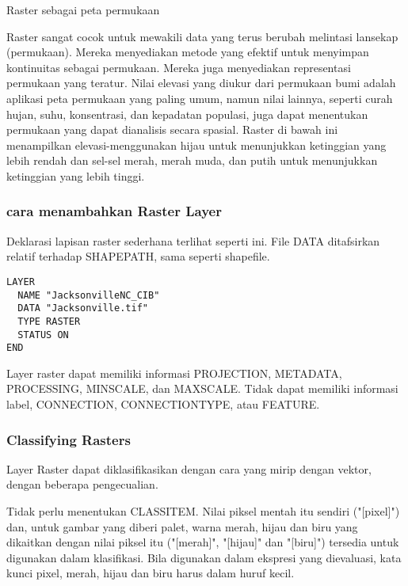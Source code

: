 Raster sebagai peta permukaan

Raster sangat cocok untuk mewakili data yang terus berubah melintasi lansekap (permukaan). Mereka menyediakan metode yang 
efektif untuk menyimpan kontinuitas sebagai permukaan. Mereka juga menyediakan representasi permukaan yang teratur. Nilai 
elevasi yang diukur dari permukaan bumi adalah aplikasi peta permukaan yang paling umum, namun nilai lainnya, seperti curah
hujan, suhu, konsentrasi, dan kepadatan populasi, juga dapat menentukan permukaan yang dapat dianalisis secara spasial. Raster
di bawah ini menampilkan elevasi-menggunakan hijau untuk menunjukkan ketinggian yang lebih rendah dan sel-sel merah, merah muda, 
dan putih untuk menunjukkan ketinggian yang lebih tinggi.


\subsubsection{cara menambahkan Raster Layer}
Deklarasi lapisan raster sederhana terlihat seperti ini. File DATA ditafsirkan relatif terhadap SHAPEPATH, sama seperti shapefile.

\begin{verbatim}
LAYER
  NAME "JacksonvilleNC_CIB"
  DATA "Jacksonville.tif"
  TYPE RASTER
  STATUS ON
END
\end{verbatim}

Layer raster dapat memiliki informasi PROJECTION, METADATA, PROCESSING, MINSCALE, dan MAXSCALE. Tidak dapat memiliki informasi label, CONNECTION, CONNECTIONTYPE, atau FEATURE.

\subsubsection{Classifying Rasters}
Layer Raster dapat diklasifikasikan dengan cara yang mirip dengan vektor, dengan beberapa pengecualian.

Tidak perlu menentukan CLASSITEM. Nilai piksel mentah itu sendiri ("[pixel]") dan, untuk gambar yang diberi palet, warna merah, hijau dan biru yang dikaitkan dengan nilai piksel itu ("[merah]", "[hijau]" dan "[biru]") tersedia untuk digunakan dalam klasifikasi. Bila digunakan dalam ekspresi yang dievaluasi, kata kunci pixel, merah, hijau dan biru harus dalam huruf kecil.

